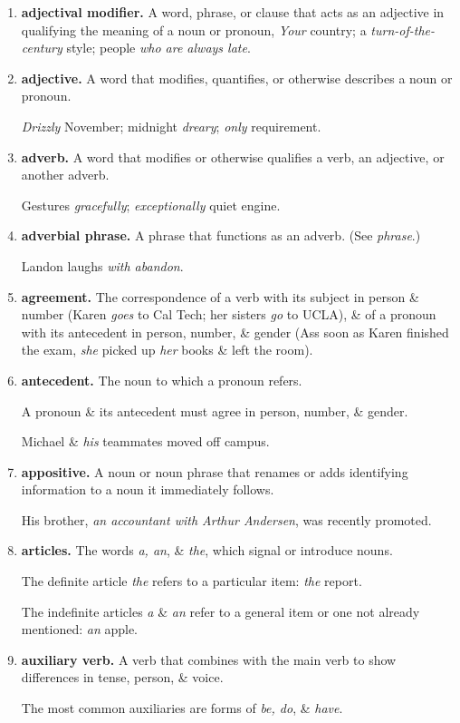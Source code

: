 \documentclass{article}
\begin{document}
\begin{enumerate}
	\item {\bf adjectival modifier.} A word, phrase, or clause that acts as an adjective in qualifying the meaning of a noun or pronoun, {\it Your} country; a {\it turn-of-the-century} style; people {\it who are always late}.
	\item {\bf adjective.} A word that modifies, quantifies, or otherwise describes a noun or pronoun.
	
	{\it Drizzly} November; midnight {\it dreary}; {\it only} requirement.
	\item {\bf adverb.} A word that modifies or otherwise qualifies a verb, an adjective, or another adverb.
	
	Gestures {\it gracefully}; {\it exceptionally} quiet engine.
	\item {\bf adverbial phrase.} A phrase that functions as an adverb. (See {\it phrase}.)
	
	Landon laughs {\it with abandon}.
	\item {\bf agreement.} The correspondence of a verb with its subject in person \& number (Karen {\it goes} to Cal Tech; her sisters {\it go} to UCLA), \& of a pronoun with its antecedent in person, number, \& gender (Ass soon as Karen finished the exam, {\it she} picked up {\it her} books \& left the room).
	\item {\bf antecedent.} The noun to which a pronoun refers.
	
	A pronoun \& its antecedent must agree in person, number, \& gender.
	
	Michael \& {\it his} teammates moved off campus.
	\item {\bf appositive.} A noun or noun phrase that renames or adds identifying information to a noun it immediately follows.
	
	His brother, {\it an accountant with Arthur Andersen}, was recently promoted.
	\item {\bf articles.} The words {\it a, an}, \& {\it the}, which signal or introduce nouns.
	
	The definite article {\it the} refers to a particular item: {\it the} report.
	
	The indefinite articles {\it a} \& {\it an} refer to a general item or one not already mentioned: {\it an} apple.
	\item {\bf auxiliary verb.} A verb that combines with the main verb to show differences in tense, person, \& voice.
	
	The most common auxiliaries are forms of {\it be, do}, \& {\it have}.
	

\end{enumerate}
\end{document}
